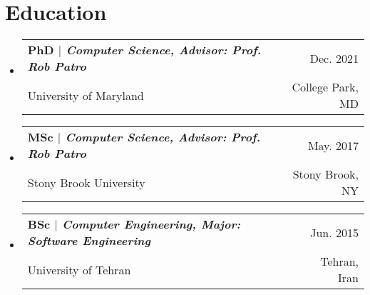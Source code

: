 \documentclass[A4,11pt]{article}
\makeatletter
\newcommand{\CVSubheading}[4]{
  \vspace{-2pt}\item
    \begin{tabular*}{0.97\textwidth}[t]{l@{\extracolsep{\fill}}r}
      \textbf{#1} & #2 \\
      \small#3 & \small #4 \\
    \end{tabular*}\vspace{-7pt}
}
\newcommand{\CVSubHeadingListStart}{\begin{itemize}[leftmargin=0.5cm, label={}]}
\newcommand{\CVSubHeadingListEnd}{\end{itemize}}
\makeatother
\begin{document}
\begin{comment}
This CV was written for specifically for positions I was applying for in
academia, and then modified to be a template.

A standard CV is about two pages long where as a resume in the US is one page.
sections can be added and removed here with this in mind. In my experience, 
education, and applicable work experience and skills are the most import things
to include on a resume. For a CV the Europass CV suggests the categories: Work
Experience, Education and Training, Language Skills, Digital Skills,
Communication and Interpersonal Skills, Conferences and Seminars, Creative Works
Driver's License, Hobbies and Interests, Honors and Awards, Management and
Leadership Skills, Networks and Memberships, Organizational Skills, Projects,
Publications, Recommendations, Social and Political Activities, Volunteering.

Your goal is to convey a who, what , when, where, why for every item you share. 
The who is obviously you, but I believe the rest should be done in that order.
For example below. An employer cares most about the degree held and typically 
less about the institution or where it is located (This is still good 
information though). Whatever order you choose be consistent throughout.
\end{comment}

\section{Education}
  \CVSubHeadingListStart
    \CVSubheading
      {{PhD $|$ \emph{\small{Computer Science, Advisor: Prof. Rob Patro}}}}{Dec. 2021}
      {University of Maryland}{College Park, MD}
    \CVSubheading
      {{MSc $|$ \emph{\small{Computer Science, Advisor: Prof. Rob Patro}}}}{May. 2017}
      {Stony Brook University}{Stony Brook, NY}
    \CVSubheading
      {{BSc $|$ \emph{\small{Computer Engineering, Major: Software Engineering}}}}{Jun. 2015}
      {University of Tehran}{Tehran, Iran}
  \CVSubHeadingListEnd


\begin{comment}
try to briefly explain what you did and why it is relevant to the position you
are seeking
\end{comment}
\end{document}
